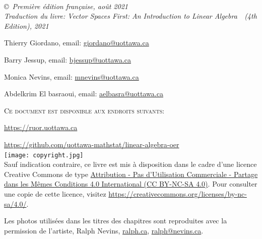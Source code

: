 \documentclass[11pt,french]{book} %
\begin{document}

\newpage
~\vfill
\thispagestyle{empty}



\vspace*{1in}

\noindent \copyright\ \textit{Premi\`ere \'edition fran\c{c}aise, août 2021}\\
\textit{Traduction du livre: \og Vector Spaces First: An Introduction to Linear Algebra\ \fg\ (4th Edition), 2021}


\smallskip
Thierry Giordano, email:
\href{mailto:giordano@uottawa.ca}{giordano@uottawa.ca}



\smallskip
Barry Jessup, email:
\href{mailto:bjessup@uottawa.ca}{bjessup@uottawa.ca}


\smallskip

Monica Nevins, email:
\href{mailto:mnevins@uottawa.ca}{mnevins@uottawa.ca}

\smallskip
Abdelkrim El basraoui, email:
\href{mailto:aelbasra@uottawa.ca}{aelbasra@uottawa.ca}

\smallskip

\noindent \textsc{Ce document est disponible aux endroits suivants:}

\href{https://ruor.uottawa.ca/handle/10393/43430?locale=fr}{https://ruor.uottawa.ca}

\href{https://github.com/uottawa-mathstat/linear-algebra-oer}{https://github.com/uottawa-mathstat/linear-algebra-oer}  \\

%


\noindent \texttt{[image: copyright.jpg]}\\ %



\noindent Sauf indication contraire, ce livre est mis à disposition dans le cadre d'une licence Creative Commons de type \href{https://creativecommons.org/licenses/by-nc-sa/4.0/}{Attribution - Pas d’Utilisation Commerciale - Partage dans les Mêmes Conditions 4.0 International (CC BY-NC-SA 4.0)}.  Pour consulter une copie de cette licence, visitez \url{https://creativecommons.org/licenses/by-nc-sa/4.0/}.

Les photos utilisées dans les titres des chapitres sont reproduites avec la permission de l'artiste, Ralph Nevins, \url{ralph.ca}, \href{mailto:ralph@nevins.ca}{ralph@nevins.ca}.
\end{document}
